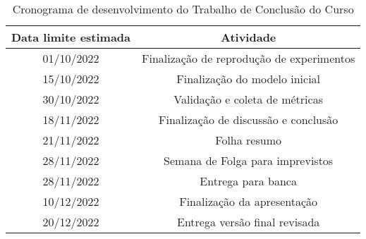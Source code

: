 

\begin{table}[!h]
    \centering
    \begin{tabular}{c|c}
        Data limite estimada & Atividade \\
        \hline
         01/10/2022 & Finalização de reprodução de experimentos\\
         15/10/2022 & Finalização do modelo inicial\\
         30/10/2022 & Validação e coleta de métricas\\
         18/11/2022 & Finalização de discussão e conclusão\\
         21/11/2022 & Folha resumo\\
         28/11/2022 & Semana de Folga para imprevistos\\
         28/11/2022 & Entrega para banca\\
         10/12/2022 & Finalização da apresentação \\
         20/12/2022 & Entrega versão final revisada\\
    \end{tabular}
    \caption{Cronograma de desenvolvimento do Trabalho de Conclusão do Curso}
    \label{tabt3:params}
\end{table} 